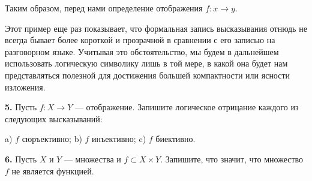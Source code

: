 Таким образом, перед нами определение отображения $f \colon x \to y$.

Этот пример еще раз показывает, что формальная запись высказывания отнюдь
не всегда бывает более короткой и прозрачной в сравнении с его записью на разговорном языке. Учитывая это обстоятельство, мы будем в дальнейшем использовать
логическую символику лишь в той мере, в какой она будет нам представляться
полезной для достижения большей компактности или ясности изложения.

\textbf{5.}\; Пусть $f \colon X \to Y$ --- отображение. Запишите логическое отрицание каждого из
следующих высказываний:

\quad a) $f$ сюръективно; \quad b) $f$ инъективно; \quad c) $f$ биективно.

\textbf{6.}\; Пусть $X$ и $Y$ --- множества и $f \subset X \times Y$. Запишите, что значит, что множество $f$
не является функцией.
